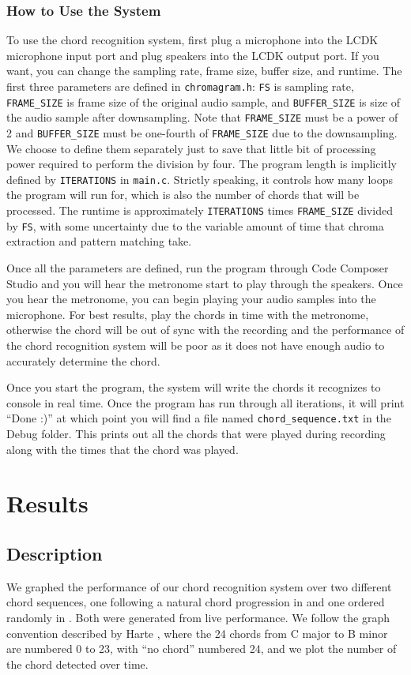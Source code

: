 \documentclass[journal]{IEEEtran}
\begin{document}
\subsubsection{How to Use the System}
To use the chord recognition system, first plug a microphone into the LCDK microphone input port and plug speakers into the LCDK output port.
If you want, you can change the sampling rate, frame size, buffer size, and runtime.
The first three parameters are defined in \texttt{chromagram.h}: \texttt{FS} is sampling rate, \texttt{FRAME\_SIZE} is frame size of the original audio sample, and \texttt{BUFFER\_SIZE} is size of the audio sample after downsampling.
Note that \texttt{FRAME\_SIZE} must be a power of 2 and \texttt{BUFFER\_SIZE} must be one-fourth of \texttt{FRAME\_SIZE} due to the downsampling.
We choose to define them separately just to save that little bit of processing power required to perform the division by four.
The program length is implicitly defined by \texttt{ITERATIONS} in \texttt{main.c}.
Strictly speaking, it controls how many loops the program will run for, which is also the number of chords that will be processed.
The runtime is approximately \texttt{ITERATIONS} times \texttt{FRAME\_SIZE} divided by \texttt{FS}, with some uncertainty due to the variable amount of time that chroma extraction and pattern matching take.

Once all the parameters are defined, run the program through Code Composer Studio and you will hear the metronome start to play through the speakers.
Once you hear the metronome, you can begin playing your audio samples into the microphone.
For best results, play the chords in time with the metronome, otherwise the chord will be out of sync with the recording and the performance of the chord recognition system will be poor as it does not have enough audio to accurately determine the chord.

Once you start the program, the system will write the chords it recognizes to console in real time.
Once the program has run through all iterations, it will print ``Done :)'' at which point you will find a file named \texttt{chord\_sequence.txt} in the Debug folder.
This prints out all the chords that were played during recording along with the times that the chord was played.


\section{Results}


\subsection{Description}
We graphed the performance of our chord recognition system over two different chord sequences, one following a natural chord progression in  and one ordered randomly in .
Both were generated from live performance.
We follow the graph convention described by Harte \cite{harte}, where the 24 chords from C major to B minor are numbered 0 to 23, with ``no chord'' numbered 24, and we plot the number of the chord detected over time.
\end{document}
